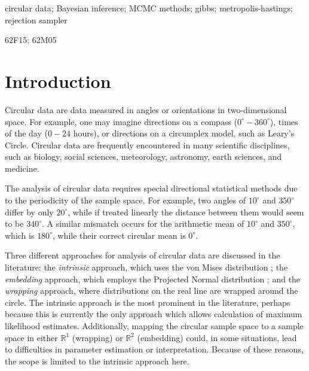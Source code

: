 \documentclass[]{gSCS2e}
\theoremstyle{plain}
\theoremstyle{definition}
\theoremstyle{remark}
\begin{document}
\begin{keywords} {circular data}; {Bayesian inference}; {MCMC methods}; {gibbs}; {metropolis-hastings}; {rejection sampler}
\end{keywords}


\begin{classcode} 62F15; 62M05 \end{classcode}
  

\newpage

\section{Introduction}

Circular data are data measured in angles or orientations in two-dimensional space. For example, one may imagine directions on a compass ($0^\circ - 360^\circ$), times of the day ($0 - 24$ hours), or directions on a circumplex model, such as Leary's Circle.\cite{Leary1957} Circular data are frequently encountered in many scientific disciplines, such as biology, social sciences, meteorology, astronomy, earth sciences, and medicine. 

The analysis of circular data requires special directional statistical methods due to the periodicity of the sample space. For example, two angles of $10^\circ$ and $350^\circ$ differ by only $20^\circ$, while if treated linearly the distance between them would seem to be $340^\circ$. A similar mismatch occurs for the arithmetic mean of $10^\circ$ and $350^\circ$, which is $180^\circ$,  while their correct circular mean is $0^\circ$. 

Three different approaches for analysis of circular data are discussed in the literature: the \textit{intrinsic} approach, which uses the von Mises distribution \cite{von1918ganzzahligkeit, damien1999fullbayes}; the \textit{embedding} approach, which employs the Projected Normal distribution \cite{Nunez-Antonio2005}; and the \textit{wrapping} approach, where distributions on the real line are wrapped around the circle.\cite{ferrari2009wrapping} The intrinsic approach is the most prominent in the literature, perhaps because this is currently the only approach which allows calculation of maximum likelihood estimates.\cite{ferrari2009wrapping} Additionally, mapping the circular sample space to a sample space in either $\mathbb{R}^1$ (wrapping) or $\mathbb{R}^2$ (embedding) could, in some situations, lead to difficulties in parameter estimation or interpretation. Because of these reasons, the scope is limited to the intrinsic approach here. %
\end{document}
